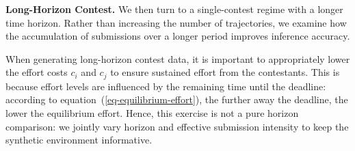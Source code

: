 \documentclass[mnsc]{informs3}
\begin{document}

\textbf{Long-Horizon Contest.}
We then turn to a single-contest regime with a longer time horizon.
Rather than increasing the number of trajectories, we examine how the accumulation of submissions over a longer period improves inference accuracy.

When generating long-horizon contest data, it is important to appropriately lower the effort costs $c_i$ and $c_j$ to ensure sustained effort from the contestants.
This is because effort levels are influenced by the remaining time until the deadline:
according to equation~(\ref{eq-equilibrium-effort}), the further away the deadline, the lower the equilibrium effort.
Hence, this exercise is not a pure horizon comparison: we jointly vary horizon and effective submission intensity to keep the synthetic environment informative.
\end{document}
